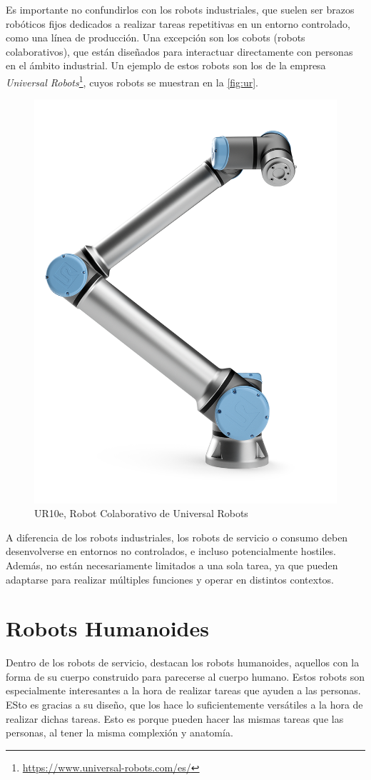 Es importante no confundirlos con los robots industriales, que suelen ser brazos robóticos fijos dedicados a realizar tareas repetitivas en un entorno controlado, como una línea de producción. Una excepción son los cobots (robots colaborativos), que están diseñados para interactuar directamente con personas en el ámbito industrial. Un ejemplo de estos robots son los de la empresa \textit{Universal Robots}\footnote{\url{https://www.universal-robots.com/es/}}, cuyos robots se muestran en la \autoref{fig:ur}.

\begin{figure}[H]
    \centering
    \includegraphics[height=0.7\textwidth]{figures/cap_1/ur10e.png}
    \caption{UR10e, Robot Colaborativo de Universal Robots}
    \label{fig:ur}
\end{figure}

A diferencia de los robots industriales, los robots de servicio o consumo deben desenvolverse en entornos no controlados, e incluso potencialmente hostiles. Además, no están necesariamente limitados a una sola tarea, ya que pueden adaptarse para realizar múltiples funciones y operar en distintos contextos.

\section{Robots Humanoides}

Dentro de los robots de servicio, destacan los robots humanoides, aquellos con la forma de su cuerpo construido para parecerse al cuerpo humano. Estos robots son especialmente interesantes a la hora de realizar tareas que ayuden a las personas. ESto es gracias a su diseño, que los hace lo suficientemente versátiles a la hora de realizar dichas tareas. Esto es porque pueden hacer las mismas tareas que las personas, al tener la misma complexión y anatomía.


